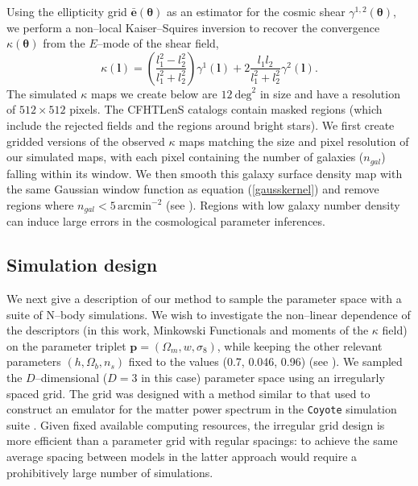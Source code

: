 \documentclass[reprint,aps,prd,superscriptaddress,showkeys,showpacs]{revtex4-1}
\begin{document}
Using the ellipticity grid $\bar{\mathbf{e}}(\pmb{\theta})$ as an
estimator for the cosmic shear $\gamma^{1,2}(\pmb{\theta})$, we
perform a non--local Kaiser--Squires inversion \citep{KS} to recover
the convergence $\kappa(\pmb{\theta})$ from the $E$--mode of the shear
field,
\begin{equation}
\kappa(\mathbf{l}) = \left(\frac{l_1^2-l_2^2}{l_1^2+l_2^2}\right)\gamma^1(\mathbf{l}) + 2\frac{l_1l_2}{l_1^2+l_2^2}\gamma^2(\mathbf{l}).
\end{equation}
The simulated $\kappa$ maps we create below are $12~\mathrm{deg}^2$ in
size and have a resolution of $512\times512$ pixels. The CFHTLenS
catalogs contain masked regions (which include the rejected fields and
the regions around bright stars). We first create gridded versions of
the observed $\kappa$ maps matching the size and pixel resolution of
our simulated maps, with each pixel containing the number of galaxies
($n_{gal}$) falling within its window.  
We then smooth this galaxy surface density map with the same Gaussian
window function as equation (\ref{gausskernel}) and remove regions
where $n_{gal} < 5 \,\mathrm{arcmin}^{−2}$ (see
\citep{CFHTMasato}). Regions with low galaxy number density can induce
large errors in the cosmological parameter inferences. 

\subsection{Simulation design}

We next give a description of our method to sample the parameter space
with a suite of N--body simulations. We wish to investigate the
non--linear dependence of the descriptors (in this work, Minkowski
Functionals and moments of the $\kappa$ field) on the parameter
triplet $\mathbf{p}=(\Omega_m,w,\sigma_8)$, while keeping the other
relevant parameters $(h,\Omega_b,n_s)$ fixed to the values (0.7,
0.046, 0.96) (see \citep{WMAP9}).
We sampled the $D$--dimensional ($D=3$ in this case) parameter space
using an irregularly spaced grid. The grid was designed with a method
similar to that used to construct an emulator for the matter power
spectrum in the \texttt{Coyote} simulation suite \citep{coyote2}.
Given fixed available computing resources, the irregular grid design
is more efficient than a parameter grid with regular spacings: to
achieve the same average spacing between models in the latter approach
would require a prohibitively large number of simulations.
\end{document}
